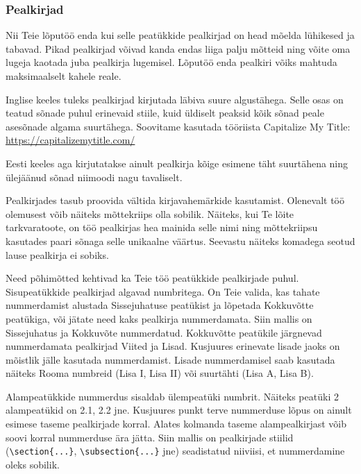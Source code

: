 \subsubsection{Pealkirjad}
Nii Teie lõputöö enda kui selle peatükkide pealkirjad on head mõelda lühikesed ja tabavad. Pikad pealkirjad võivad kanda endas liiga palju mõtteid ning võite oma lugeja kaotada juba pealkirja lugemisel. Lõputöö enda pealkiri võiks mahtuda maksimaalselt kahele reale.

Inglise keeles tuleks pealkirjad kirjutada läbiva suure algustähega. Selle osas on teatud sõnade puhul erinevaid stiile, kuid üldiselt peaksid kõik sõnad peale asesõnade algama suurtähega. Soovitame kasutada tööriista Capitalize My Title: \url{https://capitalizemytitle.com/}

Eesti keeles aga kirjutatakse ainult pealkirja kõige esimene täht suurtähena ning ülejäänud sõnad niimoodi nagu tavaliselt.

Pealkirjades tasub proovida vältida kirjavahemärkide kasutamist. Olenevalt töö olemusest võib näiteks mõttekriips olla sobilik. Näiteks, kui Te lõite tarkvaratoote, on töö pealkirjas hea mainida selle nimi ning mõttekriipsu kasutades paari sõnaga selle unikaalne väärtus. Seevastu näiteks komadega seotud lause pealkirja ei sobiks.

Need põhimõtted kehtivad ka Teie töö peatükkide pealkirjade puhul. Sisupeatükkide pealkirjad algavad numbritega. On Teie valida, kas tahate nummerdamist alustada Sissejuhatuse peatükist ja lõpetada Kokkuvõtte peatükiga, või jätate need kaks pealkirja nummerdamata. Siin mallis on Sissejuhatus ja Kokkuvõte nummerdatud. Kokkuvõtte peatükile järgnevad nummerdamata pealkirjad Viited ja Lisad. Kusjuures erinevate lisade jaoks on mõistlik jälle kasutada nummerdamist. Lisade nummerdamisel saab kasutada näiteks Rooma numbreid (Lisa I, Lisa II) või suurtähti (Lisa A, Lisa B).

Alampeatükkide nummerdus sisaldab ülempeatüki numbrit. Näiteks peatüki 2 alampeatükid on 2.1, 2.2 jne. Kusjuures punkt terve nummerduse lõpus on ainult esimese taseme pealkirjade korral. Alates kolmanda taseme alampealkirjast võib soovi korral nummerduse ära jätta. Siin mallis on pealkirjade stiilid (\verb|\section{...}|, \verb|\subsection{...}| jne) seadistatud niiviisi, et nummerdamine oleks sobilik.

